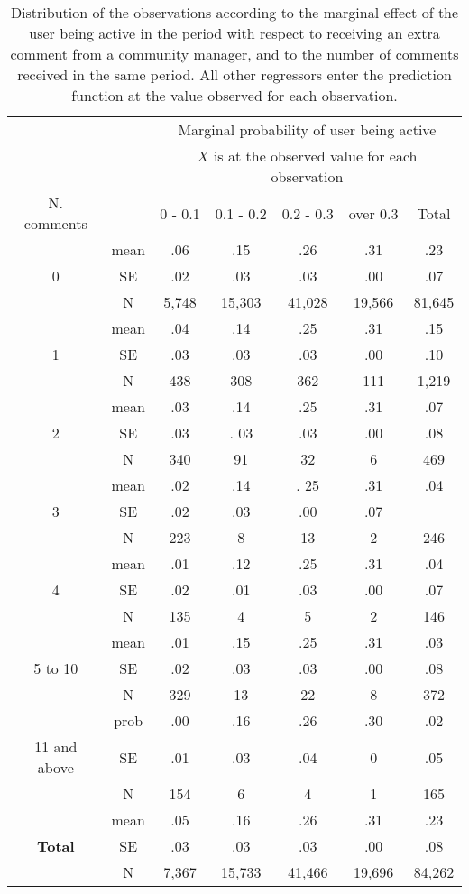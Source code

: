 \begin{table}[htbp]\centering
	\begin{tabular}{c c | c  c  c  c | c}
 		& & \multicolumn{5}{c}{Marginal probability of user being active} \\
		& & \multicolumn{5}{c}{$X$ is at the observed value for each observation} \\
		\hline
		N. comments& & 0 - 0.1&0.1 - 0.2&0.2 - 0.3&over 0.3&Total \\
		\hline
		& mean & .06 & .15 & .26 & .31 & .23 \\ 
		0 & SE & .02 & .03 & .03 & .00 & .07 \\
		& N & 5,748&15,303&41,028&19,566&81,645 \\
		\hline
		 & mean & .04 & .14 & .25 & .31 & .15 \\
		1 & SE & .03 & .03 & .03 & .00 & .10 \\
		&N&438&308&362&111&1,219 \\
		\hline
		& mean & .03 & .14 & .25 & .31 & .07 \\
		2 & SE & .03 & . 03 & .03 & .00 & .08 \\
		& N&340&91&32&6&469 \\
		\hline
		& mean & .02 & .14 & . 25 & .31 & .04 \\
		3 & SE & .02 & .03 & .00 & .07 \\
		&N&223&8&13&2&246 \\
		\hline
		& mean & .01 & .12 & .25 & .31 & .04 \\
		4 & SE & .02 & .01 & .03 & .00 & .07 \\
		& N & 135 & 4 & 5 & 2 & 146 \\
		\hline
		& mean & .01 & .15 & .25 & .31 & .03 \\
		5 to 10 & SE & .02 & .03 &.03 & .00 & .08 \\
		& N&329&13&22&8&372 \\
		\hline
		& prob & .00 & .16 & .26 & .30 & .02 \\
		11 and above & SE & .01 & .03 & .04 & 0 & .05 \\
		& N &154&6&4&1&165 \\
		\hline
		& mean & .05 & .16 & .26 & .31 &.23 \\
		\textbf{Total} & SE & .03 & .03 & .03 & .00 & .08\\
		& N &7,367&15,733&41,466&19,696&84,262 \\
		\hline
	\end{tabular}
	\caption{Distribution of the observations according to the marginal effect of the user being active in the period with respect to receiving an extra comment from a community manager, and to the number of comments received in the same period. All other regressors enter the prediction function at the value observed for each observation.}

	\label{tab:marginalProbabilityXcmrecObserved}
\end{table}

